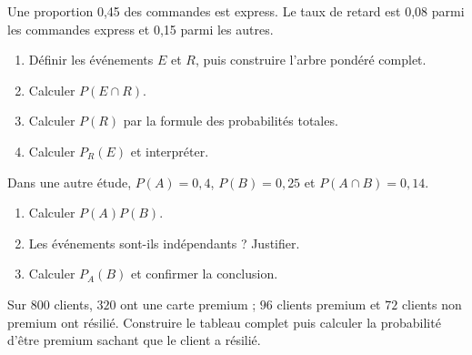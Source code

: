 \begin{exercice}
Une proportion 0{,}45 des commandes est express. Le taux de retard est 0{,}08 parmi les commandes express et 0{,}15 parmi les autres.
\begin{enumerate}
\item Définir les événements $E$ et $R$, puis construire l'arbre pondéré complet.
\item Calculer $P(E\cap R)$.
\item Calculer $P(R)$ par la formule des probabilités totales.
\item Calculer $P_R(E)$ et interpréter.
\end{enumerate}
\end{exercice}
\begin{exercice}[2 -- Indépendance]
Dans une autre étude, $P(A)=0{,}4$, $P(B)=0{,}25$ et $P(A\cap B)=0{,}14$.
\begin{enumerate}
\item Calculer $P(A)P(B)$.
\item Les événements sont-ils indépendants ? Justifier.
\item Calculer $P_A(B)$ et confirmer la conclusion.
\end{enumerate}
\end{exercice}
\begin{exercice}
Sur $800$ clients, $320$ ont une carte premium ; $96$ clients premium et $72$ clients non premium ont résilié. Construire le tableau complet puis calculer la probabilité d'être premium sachant que le client a résilié.
\end{exercice}

